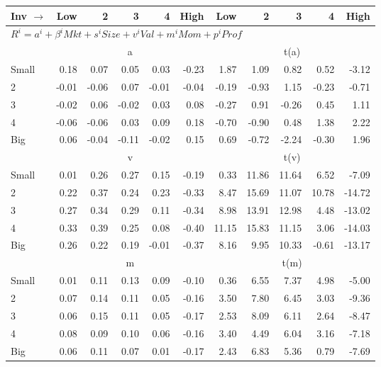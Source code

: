 
\begin{tabular}{lrrrrrrrrrr}
  \toprule
    
    Inv $\rightarrow$ & Low & 2 & 3 & 4 & High & Low & 2 & 3 & 4 & High  \\ 
  \midrule
  \multicolumn{11}{l}{$R^i=a^i+\beta^iMkt+s^iSize+v^iVal+m^iMom+p^iProf$}  \\
  
     & \multicolumn{5}{c}{a} & \multicolumn{5}{c}{t(a)}   \\
     \cmidrule(r){2-6} \cmidrule(r){7-11} 
    Small  & 0.18  & 0.07  & 0.05  & 0.03  & -0.23  & 1.87  & 1.09  & 0.82  & 0.52  & -3.12   \\
    2  & -0.01  & -0.06  & 0.07  & -0.01  & -0.04  & -0.19  & -0.93  & 1.15  & -0.23  & -0.71   \\
    3  & -0.02  & 0.06  & -0.02  & 0.03  & 0.08  & -0.27  & 0.91  & -0.26  & 0.45  & 1.11   \\
    4  & -0.06  & -0.06  & 0.03  & 0.09  & 0.18  & -0.70  & -0.90  & 0.48  & 1.38  & 2.22   \\
    Big  & 0.06  & -0.04  & -0.11  & -0.02  & 0.15  & 0.69  & -0.72  & -2.24  & -0.30  & 1.96   \\
  
     & \multicolumn{5}{c}{v} & \multicolumn{5}{c}{t(v)}   \\
     \cmidrule(r){2-6} \cmidrule(r){7-11} 
    Small  & 0.01  & 0.26  & 0.27  & 0.15  & -0.19  & 0.33  & 11.86  & 11.64  & 6.52  & -7.09   \\
    2  & 0.22  & 0.37  & 0.24  & 0.23  & -0.33  & 8.47  & 15.69  & 11.07  & 10.78  & -14.72   \\
    3  & 0.27  & 0.34  & 0.29  & 0.11  & -0.34  & 8.98  & 13.91  & 12.98  & 4.48  & -13.02   \\
    4  & 0.33  & 0.39  & 0.25  & 0.08  & -0.40  & 11.15  & 15.83  & 11.15  & 3.06  & -14.03   \\
    Big  & 0.26  & 0.22  & 0.19  & -0.01  & -0.37  & 8.16  & 9.95  & 10.33  & -0.61  & -13.17   \\
    
  
     & \multicolumn{5}{c}{m} & \multicolumn{5}{c}{t(m)}   \\
     \cmidrule(r){2-6} \cmidrule(r){7-11} 
    Small  & 0.01  & 0.11  & 0.13  & 0.09  & -0.10  & 0.36  & 6.55  & 7.37  & 4.98  & -5.00   \\
    2  & 0.07  & 0.14  & 0.11  & 0.05  & -0.16  & 3.50  & 7.80  & 6.45  & 3.03  & -9.36   \\
    3  & 0.06  & 0.15  & 0.11  & 0.05  & -0.17  & 2.53  & 8.09  & 6.11  & 2.64  & -8.47   \\
    4  & 0.08  & 0.09  & 0.10  & 0.06  & -0.16  & 3.40  & 4.49  & 6.04  & 3.16  & -7.18   \\
    Big  & 0.06  & 0.11  & 0.07  & 0.01  & -0.17  & 2.43  & 6.83  & 5.36  & 0.79  & -7.69   \\
    

\end{tabular}
